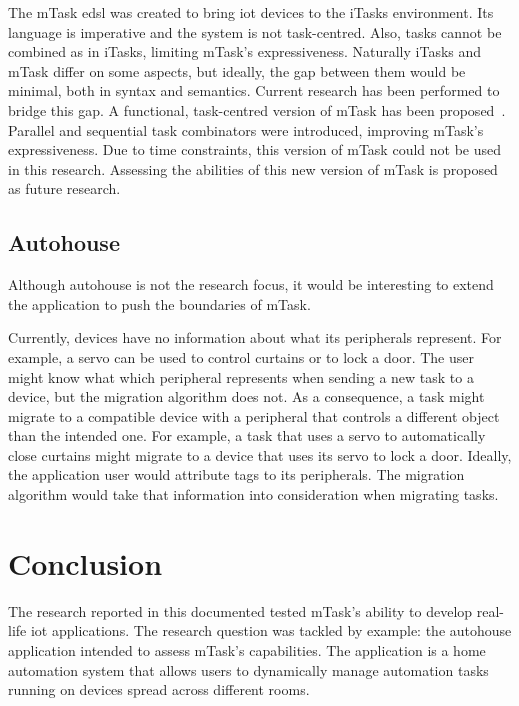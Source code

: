 The \gls{mTask} \acs{edsl} was created to bring \acs{iot} devices to the \gls{iTasks} environment. Its language is imperative and the system is not task-centred. Also, tasks cannot be combined as in \gls{iTasks}, limiting \gls{mTask}'s expressiveness. Naturally \gls{iTasks} and \gls{mTask} differ on some aspects, but ideally, the gap between them would be minimal, both in syntax and semantics. Current research has been performed to bridge this gap. A functional, task-centred version of \gls{mTask} has been proposed~\cite{micro}. Parallel and sequential task combinators were introduced, improving \gls{mTask}'s expressiveness. Due to time constraints, this version of \gls{mTask} could not be used in this research. Assessing the abilities of this new version of \gls{mTask} is proposed as future research.

\subsection{Autohouse}

Although \gls{autohouse} is not the research focus, it would be interesting to extend the application to push the boundaries of \gls{mTask}. 

Currently, devices have no information about what its peripherals represent. For example, a servo can be used to control curtains or to lock a door. The user might know what which peripheral represents when sending a new task to a device, but the migration algorithm does not. As a consequence, a task might migrate to a compatible device with a peripheral that controls a different object than the intended one. For example, a task that uses a servo to automatically close curtains might migrate to a device that uses its servo to lock a door. Ideally, the application user would attribute tags to its peripherals. The migration algorithm would take that information into consideration when migrating tasks.


\section{Conclusion}

The research reported in this documented tested \gls{mTask}'s ability to develop real-life \acs{iot} applications. The research question was tackled by example: the \gls{autohouse} application intended to assess \gls{mTask}'s capabilities. The application is a home automation system that allows users to dynamically manage automation tasks running on devices spread across different rooms. 

